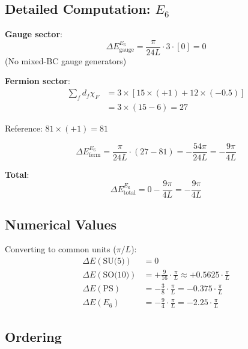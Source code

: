 \documentclass[11pt,a4paper]{article}
\begin{document}
\subsection{Detailed Computation: $E_6$}

\begin{computebox}
\textbf{Gauge sector}:
\begin{equation}
\label{eq:comp-e6-gauge}
\Delta E_{\text{gauge}}^{E_6} = \frac{\pi}{24L} \cdot 3 \cdot [0] = 0
\end{equation}
(No mixed-BC gauge generators)

\textbf{Fermion sector}:
\begin{align}
\label{eq:comp-e6-ferm-detail}
\sum_f d_f \chi_F &= 3 \times [15 \times (+1) + 12 \times (-0.5)] \\
\label{eq:comp-e6-ferm-eval}
&= 3 \times (15 - 6) = 27
\end{align}

Reference: $81 \times (+1) = 81$

\begin{equation}
\label{eq:comp-e6-ferm-final}
\Delta E_{\text{ferm}}^{E_6} = \frac{\pi}{24L} \cdot (27 - 81) = -\frac{54\pi}{24L} = -\frac{9\pi}{4L}
\end{equation}

\textbf{Total}:
\begin{equation}
\label{eq:comp-e6-total}
\Delta E_{\text{total}}^{E_6} = 0 - \frac{9\pi}{4L} = -\frac{9\pi}{4L}
\end{equation}
\end{computebox}

\subsection{Numerical Values}

Converting to common units ($\pi/L$):
\begin{align}
\label{eq:num-su5}
\Delta E(\text{SU(5)}) &= 0 \\
\label{eq:num-so10}
\Delta E(\text{SO(10)}) &= +\frac{9}{16} \cdot \frac{\pi}{L} \approx +0.5625 \cdot \frac{\pi}{L} \\
\label{eq:num-ps}
\Delta E(\text{PS}) &= -\frac{3}{8} \cdot \frac{\pi}{L} = -0.375 \cdot \frac{\pi}{L} \\
\label{eq:num-e6}
\Delta E(E_6) &= -\frac{9}{4} \cdot \frac{\pi}{L} = -2.25 \cdot \frac{\pi}{L}
\end{align}

\subsection{Ordering}
\end{document}
